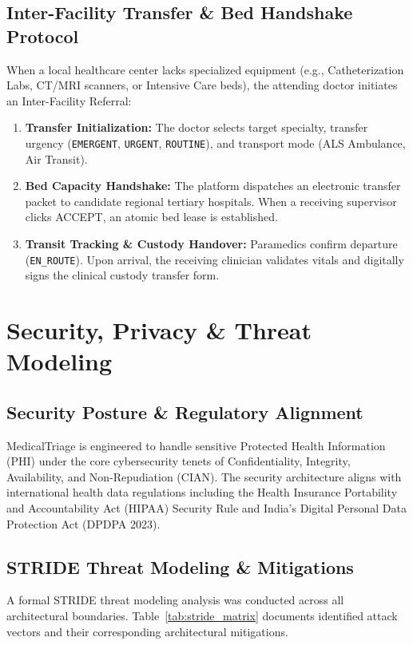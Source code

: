 \documentclass[11pt,a4paper,oneside]{report}
\begin{document}
\section{Inter-Facility Transfer \& Bed Handshake Protocol}
When a local healthcare center lacks specialized equipment (e.g., Catheterization Labs, CT/MRI scanners, or Intensive Care beds), the attending doctor initiates an Inter-Facility Referral:
\begin{enumerate}[leftmargin=20pt]
  \item \textbf{Transfer Initialization:} The doctor selects target specialty, transfer urgency (\texttt{EMERGENT}, \texttt{URGENT}, \texttt{ROUTINE}), and transport mode (ALS Ambulance, Air Transit).
  \item \textbf{Bed Capacity Handshake:} The platform dispatches an electronic transfer packet to candidate regional tertiary hospitals. When a receiving supervisor clicks ACCEPT, an atomic bed lease is established.
  \item \textbf{Transit Tracking \& Custody Handover:} Paramedics confirm departure (\texttt{EN\_ROUTE}). Upon arrival, the receiving clinician validates vitals and digitally signs the clinical custody transfer form.
\end{enumerate}

\chapter{Security, Privacy \& Threat Modeling}

\section{Security Posture \& Regulatory Alignment}
MedicalTriage is engineered to handle sensitive Protected Health Information (PHI) under the core cybersecurity tenets of Confidentiality, Integrity, Availability, and Non-Repudiation (CIAN). The security architecture aligns with international health data regulations including the Health Insurance Portability and Accountability Act (HIPAA) Security Rule and India's Digital Personal Data Protection Act (DPDPA 2023).

\section{STRIDE Threat Modeling \& Mitigations}
A formal STRIDE threat modeling analysis was conducted across all architectural boundaries. Table~\ref{tab:stride_matrix} documents identified attack vectors and their corresponding architectural mitigations.
\end{document}
